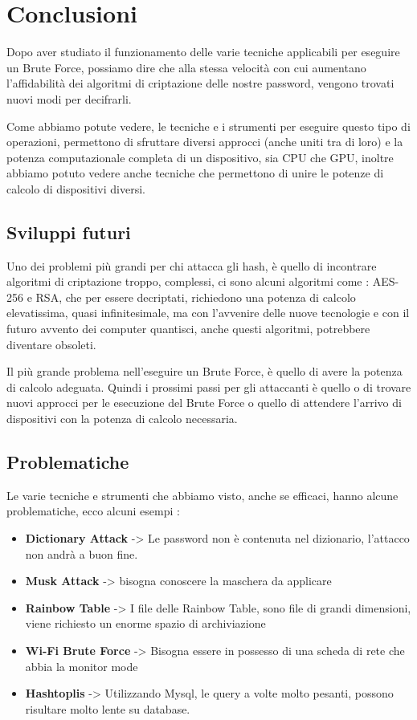 \chapter{Conclusioni}

Dopo aver studiato il funzionamento delle varie tecniche applicabili per eseguire un Brute Force, possiamo dire che alla stessa velocità con cui aumentano l'affidabilità dei algoritmi di criptazione delle nostre password, vengono trovati nuovi modi per decifrarli.

Come abbiamo potute vedere, le tecniche e i strumenti per eseguire questo tipo di operazioni, permettono di sfruttare diversi approcci (anche uniti tra di loro) e la potenza computazionale completa di un dispositivo, sia CPU che GPU, inoltre abbiamo potuto vedere anche tecniche che permettono di unire le potenze di calcolo di dispositivi diversi.

\section{Sviluppi futuri}

Uno dei problemi più grandi per chi attacca gli hash, è quello di incontrare algoritmi di criptazione troppo, complessi, ci sono alcuni algoritmi come : AES-256 e RSA, che per essere decriptati, richiedono una potenza di calcolo elevatissima, quasi infinitesimale, ma con l'avvenire delle nuove tecnologie e con il futuro avvento dei computer quantisci, anche questi algoritmi, potrebbere diventare obsoleti.  

Il più grande problema nell'eseguire un Brute Force, è quello di avere la potenza di calcolo adeguata. Quindi i prossimi passi per gli attaccanti è quello o di trovare nuovi approcci per le esecuzione del Brute Force o quello di attendere l'arrivo di dispositivi con la potenza di calcolo necessaria.

\section{Problematiche}

Le varie tecniche e strumenti che abbiamo visto, anche se efficaci, hanno alcune problematiche, ecco alcuni esempi :

\begin{itemize}
    \item \textbf{Dictionary Attack} -> Le password non è contenuta nel dizionario, l'attacco non andrà a buon fine.
    \item \textbf{Musk Attack} -> bisogna conoscere la maschera da applicare
    \item \textbf{Rainbow Table } -> I file delle Rainbow Table, sono file di grandi dimensioni, viene richiesto un enorme spazio di archiviazione
    \item \textbf{Wi-Fi Brute Force} -> Bisogna essere in possesso di una scheda di rete che abbia la monitor mode
    \item \textbf{Hashtoplis } -> Utilizzando Mysql, le query a volte molto pesanti, possono risultare molto lente su database.
\end{itemize}

